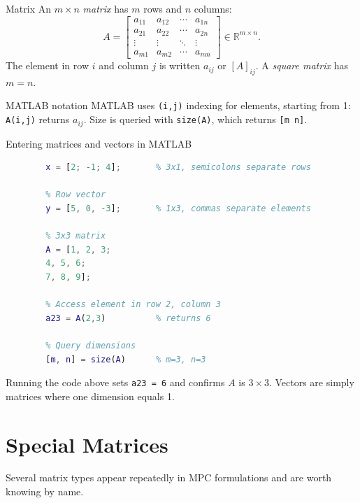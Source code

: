 \begin{defnbox}{Matrix}
	An $m \times n$ \emph{matrix} has $m$ rows and $n$ columns:
	\[
	A =
	\begin{bmatrix}
		a_{11} & a_{12} & \cdots & a_{1n} \\
		a_{21} & a_{22} & \cdots & a_{2n} \\
		\vdots & \vdots & \ddots & \vdots \\
		a_{m1} & a_{m2} & \cdots & a_{mn}
	\end{bmatrix}
	\in \mathbb{R}^{m \times n}.
	\]
	The element in row $i$ and column $j$ is written $a_{ij}$ or
	$[A]_{ij}$.  A \emph{square matrix} has $m = n$.
\end{defnbox}

\begin{notebox}{MATLAB notation}
	MATLAB uses \texttt{(i,j)} indexing for elements, starting from 1:
	\texttt{A(i,j)} returns $a_{ij}$.  Size is queried with
	\texttt{size(A)}, which returns \texttt{[m n]}.
\end{notebox}

\begin{examplebox}{Entering matrices and vectors in MATLAB}
	\begin{lstlisting}[language=Matlab]
		% Column vector
		x = [2; -1; 4];       % 3x1, semicolons separate rows
		
		% Row vector
		y = [5, 0, -3];       % 1x3, commas separate elements
		
		% 3x3 matrix
		A = [1, 2, 3;
		4, 5, 6;
		7, 8, 9];
		
		% Access element in row 2, column 3
		a23 = A(2,3)          % returns 6
		
		% Query dimensions
		[m, n] = size(A)      % m=3, n=3
	\end{lstlisting}
	
	\solution
	Running the code above sets \texttt{a23 = 6} and confirms $A$ is
	$3\times 3$.  Vectors are simply matrices where one dimension equals 1.
\end{examplebox}

\section{Special Matrices}
\label{sec:app_special}

Several matrix types appear repeatedly in MPC formulations and are
worth knowing by name.

